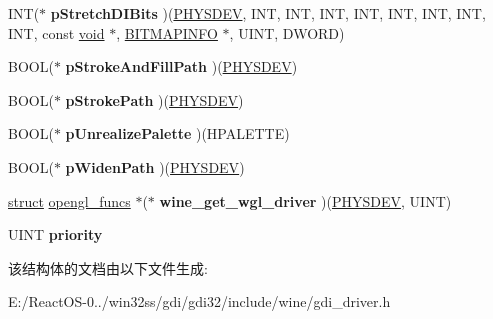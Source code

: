 \begin{DoxyCompactItemize}
I\+NT($\ast$ {\bfseries p\+Stretch\+D\+I\+Bits} )(\hyperlink{structgdi__physdev}{P\+H\+Y\+S\+D\+EV}, I\+NT, I\+NT, I\+NT, I\+NT, I\+NT, I\+NT, I\+NT, I\+NT, const \hyperlink{interfacevoid}{void} $\ast$, \hyperlink{structtag_b_i_t_m_a_p_i_n_f_o}{B\+I\+T\+M\+A\+P\+I\+N\+FO} $\ast$, U\+I\+NT, D\+W\+O\+RD)
\item 
\mbox{\label{structgdi__dc__funcs_a956c04e5a8118ef9d78a77500bb87a63}} 
B\+O\+OL($\ast$ {\bfseries p\+Stroke\+And\+Fill\+Path} )(\hyperlink{structgdi__physdev}{P\+H\+Y\+S\+D\+EV})
\item 
\mbox{\label{structgdi__dc__funcs_a33765b9813b2fcea3791403ca803034a}} 
B\+O\+OL($\ast$ {\bfseries p\+Stroke\+Path} )(\hyperlink{structgdi__physdev}{P\+H\+Y\+S\+D\+EV})
\item 
\mbox{\label{structgdi__dc__funcs_a5cdea8c9f70f25be04625c997abca2f5}} 
B\+O\+OL($\ast$ {\bfseries p\+Unrealize\+Palette} )(H\+P\+A\+L\+E\+T\+TE)
\item 
\mbox{\label{structgdi__dc__funcs_af3a0a05cbbeab31aadbc26b2b6c66e34}} 
B\+O\+OL($\ast$ {\bfseries p\+Widen\+Path} )(\hyperlink{structgdi__physdev}{P\+H\+Y\+S\+D\+EV})
\item 
\mbox{\label{structgdi__dc__funcs_a6b289109c147c100a2a2c830a052ddf1}} 
\hyperlink{interfacestruct}{struct} \hyperlink{structopengl__funcs}{opengl\+\_\+funcs} $\ast$($\ast$ {\bfseries wine\+\_\+get\+\_\+wgl\+\_\+driver} )(\hyperlink{structgdi__physdev}{P\+H\+Y\+S\+D\+EV}, U\+I\+NT)
\item 
\mbox{\label{structgdi__dc__funcs_a65fc175147f4c43abde5aa3dd90aa013}} 
U\+I\+NT {\bfseries priority}
\end{DoxyCompactItemize}


该结构体的文档由以下文件生成\+:\begin{DoxyCompactItemize}
\item 
E\+:/\+React\+O\+S-\/0../win32ss/gdi/gdi32/include/wine/gdi\+\_\+driver.\+h\end{DoxyCompactItemize}
